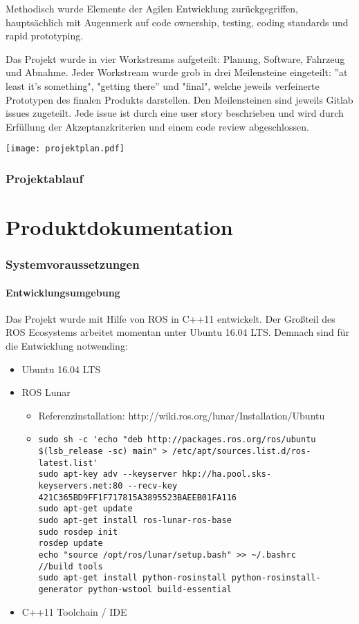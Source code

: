 \documentclass[a4paper, 12pt, titlepage]{scrartcl}
\begin{document}
	Methodisch wurde Elemente der Agilen Entwicklung zurückgegriffen, hauptsächlich mit Augenmerk auf code ownership, testing, coding standards und rapid prototyping. 

	Das Projekt wurde in vier Workstreams aufgeteilt: Planung, Software, Fahrzeug und Abnahme. Jeder Workstream wurde grob in drei Meilensteine eingeteilt: ''at least it's something", "getting there'' und "final", welche jeweils verfeinerte Prototypen des finalen Produkts darstellen. Den Meilensteinen sind jeweils Gitlab issues zugeteilt. Jede issue ist durch eine user story beschrieben und wird durch Erfüllung der Akzeptanzkriterien und einem code review abgeschlossen.

	\texttt{[image: projektplan.pdf]}

	\section{Projektablauf} 
	\label{projektablauf}
\newpage
\part{Produktdokumentation}
	\section{Systemvoraussetzungen} 
	\label{systemvoraussetzungen}
	\subsection{Entwicklungsumgebung}
	Das Projekt wurde mit Hilfe von ROS in C++11 entwickelt. Der Großteil des ROS Ecosystems arbeitet momentan unter Ubuntu 16.04 LTS. Demnach sind für die Entwicklung notwending:
	\begin{itemize}
		\item Ubuntu 16.04 LTS
		\item ROS Lunar
		\begin{itemize}
			\item Referenzinstallation: http://wiki.ros.org/lunar/Installation/Ubuntu
			\item[] \begin{lstlisting}
sudo sh -c 'echo "deb http://packages.ros.org/ros/ubuntu $(lsb_release -sc) main" > /etc/apt/sources.list.d/ros-latest.list'
sudo apt-key adv --keyserver hkp://ha.pool.sks-keyservers.net:80 --recv-key 421C365BD9FF1F717815A3895523BAEEB01FA116
sudo apt-get update
sudo apt-get install ros-lunar-ros-base
sudo rosdep init
rosdep update
echo "source /opt/ros/lunar/setup.bash" >> ~/.bashrc
//build tools
sudo apt-get install python-rosinstall python-rosinstall-generator python-wstool build-essential
		\end{lstlisting}
		\end{itemize}
		\item C++11 Toolchain / IDE
	\end{itemize}
\end{document}
